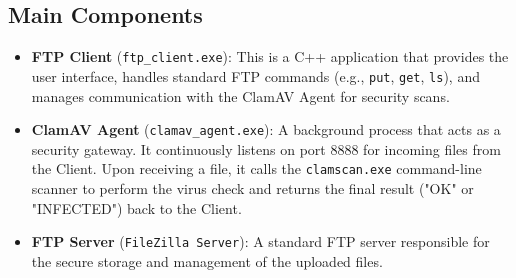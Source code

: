 \subsection{Main Components}
\begin{itemize}
    \item \textbf{FTP Client} (\texttt{ftp\_client.exe}): This is a C++ application that provides the user interface, handles standard FTP commands (e.g., \texttt{put}, \texttt{get}, \texttt{ls}), and manages communication with the ClamAV Agent for security scans.
    \item \textbf{ClamAV Agent} (\texttt{clamav\_agent.exe}): A background process that acts as a security gateway. It continuously listens on port 8888 for incoming files from the Client. Upon receiving a file, it calls the \texttt{clamscan.exe} command-line scanner to perform the virus check and returns the final result ("OK" or "INFECTED") back to the Client.
    \item \textbf{FTP Server} (\texttt{FileZilla Server}): A standard FTP server responsible for the secure storage and management of the uploaded files.
\end{itemize}

